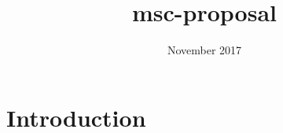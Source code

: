 \documentclass{article}
\title{msc-proposal}
\author{}
\date{November 2017}
\begin{document}
\maketitle

\section{Introduction}
\end{document}
